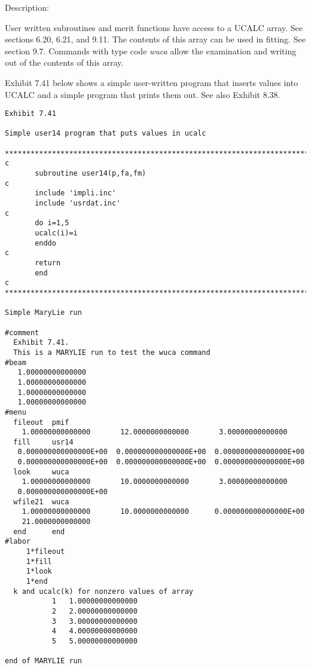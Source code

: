 \vspace{5mm}
     Description:
\vspace{2mm}

User written subroutines and merit functions have access to a UCALC array.  See sections 6.20, 6.21, and 9.11.  The contents of this array can be used in fitting.  See section 9.7.  Commands with type code {\em wuca} allow the examination and writing out of the contents of this array.

Exhibit 7.41 below shows a simple user-written program that inserts values into UCALC and a simple \Mary program that prints them out.  See also Exhibit 8.38.

\begin{footnotesize}
\begin{verbatim}
Exhibit 7.41

Simple user14 program that puts values in ucalc

***********************************************************************
c
       subroutine user14(p,fa,fm)
c
       include 'impli.inc'
       include 'usrdat.inc'
c
       do i=1,5
       ucalc(i)=i
       enddo
c
       return
       end
c
***********************************************************************

Simple MaryLie run

#comment
  Exhibit 7.41.
  This is a MARYLIE run to test the wuca command
#beam
   1.00000000000000
   1.00000000000000
   1.00000000000000
   1.00000000000000
#menu
  fileout  pmif
    1.00000000000000       12.0000000000000       3.00000000000000
  fill     usr14
   0.000000000000000E+00  0.000000000000000E+00  0.000000000000000E+00
   0.000000000000000E+00  0.000000000000000E+00  0.000000000000000E+00
  look     wuca
    1.00000000000000       10.0000000000000       3.00000000000000
   0.000000000000000E+00
  wfile21  wuca
    1.00000000000000       10.0000000000000      0.000000000000000E+00
    21.0000000000000
  end      end
#labor
     1*fileout
     1*fill
     1*look
     1*end
  k and ucalc(k) for nonzero values of array
           1   1.00000000000000
           2   2.00000000000000
           3   3.00000000000000
           4   4.00000000000000
           5   5.00000000000000

end of MARYLIE run
\end{verbatim}
\end{footnotesize}

\newpage
